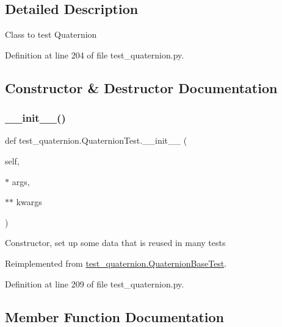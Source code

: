 \subsection{Detailed Description}
\begin{DoxyVerb}Class to test Quaternion
\end{DoxyVerb}
 

Definition at line 204 of file test\+\_\+quaternion.\+py.



\subsection{Constructor \& Destructor Documentation}
\mbox{\label{classtest__quaternion_1_1QuaternionTest_a4212d313a1824e188d86a81498483219}} 
\subsubsection{\texorpdfstring{\_\_init\_\_()}{\_\_init\_\_()}}
{\footnotesize\ttfamily def test\+\_\+quaternion.\+Quaternion\+Test.\+\_\+\+\_\+init\+\_\+\+\_\+ (\begin{DoxyParamCaption}\item[{}]{self,  }\item[{$\ast$}]{args,  }\item[{$\ast$$\ast$}]{kwargs }\end{DoxyParamCaption})}

\begin{DoxyVerb}Constructor, set up some data that is reused in many tests\end{DoxyVerb}
 

Reimplemented from \mbox{\hyperlink{classtest__quaternion_1_1QuaternionBaseTest_a171a0ff5c571de3b9433e5e00799f467}{test\+\_\+quaternion.\+Quaternion\+Base\+Test}}.



Definition at line 209 of file test\+\_\+quaternion.\+py.



\subsection{Member Function Documentation}
\mbox{\label{classtest__quaternion_1_1QuaternionTest_af2b57e92282ce65afff7c526d4c619ca}} 
